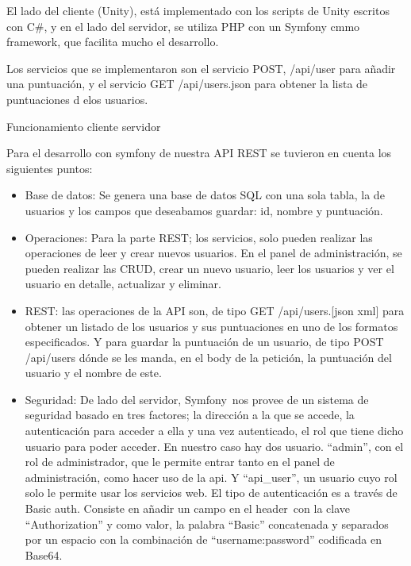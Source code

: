 El lado del cliente (Unity), está implementado con los scripts de Unity escritos con C#, y en el lado del servidor, se utiliza PHP con un Symfony cmmo framework, que facilita mucho el desarrollo.

Los servicios que se implementaron son el servicio POST, /api/user para añadir una puntuación, y el servicio GET /api/users.json para obtener la lista de puntuaciones d elos usuarios.

		{Funcionamiento cliente servidor}


Para el desarrollo con symfony de nuestra API REST se tuvieron en cuenta los siguientes puntos:

\begin{itemize}
\item{Base de datos: Se genera una base de datos SQL con una sola tabla, la de usuarios y los campos que deseabamos guardar: id, nombre y puntuación.}

\item{Operaciones: Para la parte REST; los servicios, solo pueden realizar las operaciones de leer y crear nuevos usuarios. En el panel de administración, se pueden realizar las CRUD, crear un nuevo usuario, leer los usuarios y ver el usuario en detalle, actualizar y eliminar.}

\item{REST: las operaciones de la API son, de tipo GET /api/users.{[}json \textbar{} xml{]} para obtener un listado de los usuarios y sus puntuaciones en uno de los formatos especificados. Y para guardar la puntuación de un usuario, de tipo POST /api/users dónde se les manda, en el body de la petición, la puntuación del usuario y el nombre de este.}

\item{Seguridad: De lado del servidor, Symfony~nos provee de un sistema de seguridad basado en tres factores; la dirección a la que se accede, la autenticación para acceder a ella y una vez autenticado, el rol que tiene dicho usuario para poder acceder. En nuestro caso hay dos usuario. ``admin'', con el rol de administrador, que le permite entrar tanto en el panel de administración, como hacer uso de la api. Y ``api\_user'', un usuario cuyo rol solo le permite usar los servicios web. El tipo de autenticación es a través de Basic auth. Consiste en añadir un campo en el header~con la clave ``Authorization'' y como valor, la palabra ``Basic'' concatenada y separados por un espacio con la combinación de ``username:password'' codificada en Base64.}
\end{itemize}

